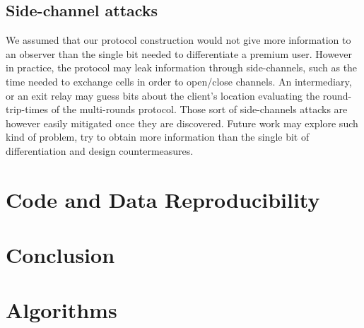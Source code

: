 \documentclass[sigconf, anonymous]{acmart}
\begin{document}
\subsection{Side-channel attacks}
We assumed that our protocol construction would not give more information to an observer than the single bit needed to differentiate a premium user. However in practice, the protocol may leak information through side-channels, such as the time needed to exchange cells in order to open/close channels. An intermediary, or an exit relay may guess bits about the client's location evaluating the round-trip-times of the multi-rounds protocol. Those sort of side-channels attacks are however easily mitigated once they are discovered. Future work may explore such kind of problem, try to obtain more information than the single bit of differentiation and design countermeasures.

\section{Code and Data Reproducibility}
\label{sec:code}

\section{Conclusion}
\label{sec:conclusion}



\appendix

\section{Algorithms}
\label{sec:algorithms}

\end{document}
